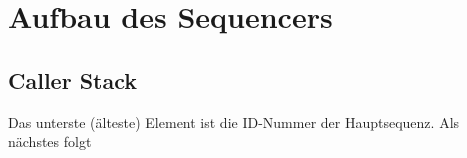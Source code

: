 \chapter{Aufbau des Sequencers}


\section{Caller Stack}
Das unterste (älteste) Element ist die ID-Nummer der Hauptsequenz.
Als nächstes folgt 
